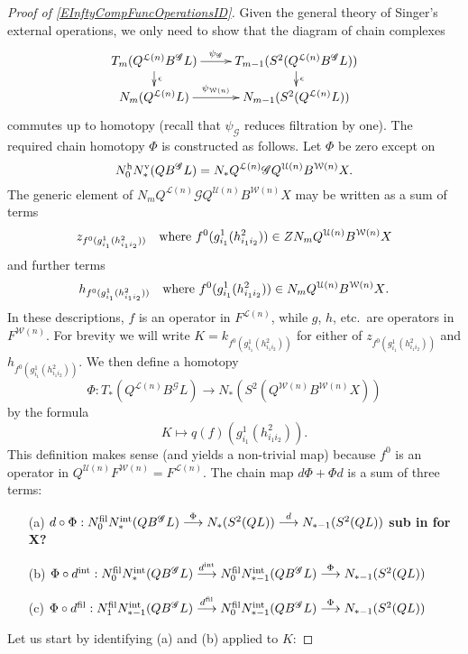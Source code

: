 \documentclass[11pt]{amsart}
\theoremstyle{plain}
\theoremstyle{definition}
\renewcommand{\to}{\longrightarrow}
\newcommand{\squishlist}{
  \setlength{\itemsep}{.5pt}
  \setlength{\parskip}{0pt}
  \setlength{\parsep}{0pt}}
\newcommand{\scrG}{\mathscr{G}}
\newcommand{\calU}{\mathcal{U}}
\newcommand{\calL}{\mathcal{L}}
\newcommand{\calw}{\mathcal{W}}
\theoremstyle{plain}
\newcommand{\BSW}{{\scrG}}
\newcommand{\BSWres}{B^\BSW}%
\begin{document}
\begin{Operations in composite functor spectral sequences}
\begin{proof}[Proof of \ref{EInftyCompFuncOperationsID}]
Given the general theory of Singer's external operations, we only need to show that the diagram of chain complexes
\[\xymatrix@R=4mm{
T_{m}(Q^{\calL(n)}\BSWres L)
\ar[r]^-{\psi_{\BSW}}
\ar[d]^-{\epsilon}
&%
T_{m-1}(S^2(Q^{\calL(n)}\BSWres L))\ar[d]^-{\epsilon}
\\%
N_{m}(Q^{\calL(n)}L)
\ar[r]^-{\psi_{\calw(n)}}
&%
N_{m-1}(S^2(Q^{\calL(n)} L))
}\]
commutes up to homotopy (recall that $\psi_{\BSW}$ reduces filtration by one). The required chain homotopy $\Phi$ is constructed as follows. Let $\Phi$ be zero except on 
\[N_0^\textup{h}N_*^\textup{v}(Q\BSWres L)=N_*Q^{\calL(n)}\BSW Q^{\calU(n)}B^{\calw(n)}X.\]
The generic element of $N_mQ^{\calL(n)}\BSW Q^{\calU(n)}B^{\calw(n)}X$ may be written as a sum of terms
\[z_{f^0(g^1_{i_1}(h^2_{i_1i_2}))}\textup{\quad where $f^0(g^1_{i_1}(h^2_{i_1i_2}))\in ZN_m Q^{\calU(n)}B^{\calw(n)}X$}\]
and further terms
\[h_{f^0(g^1_{i_1}(h^2_{i_1i_2}))}\textup{\quad where $f^0(g^1_{i_1}(h^2_{i_1i_2}))\in N_{m} Q^{\calU(n)}B^{\calw(n)}X$}.\]
In these descriptions, $f$ is an operator in $F^{\calL(n)}$, while $g$, $h$, etc.\ are operators in $F^{\calw(n)}$.
For brevity we will write $K=k_{f^0(g^1_{i_1}(h^2_{i_1i_2}))}$ for either of $z_{f^0(g^1_{i_1}(h^2_{i_1i_2}))}$ and $h_{f^0(g^1_{i_1}(h^2_{i_1i_2}))}$.
We then define a homotopy 
\[\Phi:T_*(Q^{\calL(n)}\BSWres L)\to N_*(S^2(Q^{\calw(n)}B^{\calw(n)}X))\]
by the formula
\[K\mapsto q(f)(g^1_{i_1}(h^2_{i_1i_2})).\]
This definition makes sense (and yields a non-trivial map) because $f^0$ is an operator in $Q^{\calU(n)}F^{\calw(n)}=F^{\calL(n)}$.
The chain map $d\Phi+\Phi d$ is a sum of three terms:
\begin{enumerate}\squishlist
\setlength{\parindent}{.25in}
\item[(a)] $d\circ\Phi:N_0^\textup{fil}N_*^\textup{int}(Q\BSWres L)\overset{\Phi}{\to} N_*(S^2(QL))\overset{d}{\to} N_{*-1}(S^2(QL))$ \textbf{sub in for X?}
\item[(b)] $\Phi\circ d^\textup{int}:N_0^\textup{fil}N_{*}^\textup{int}(Q\BSWres L)\overset{d^\textup{int}}{\to} N_0^\textup{fil}N_{*-1}^\textup{int}(Q\BSWres L)\overset{\Phi}{\to} N_{*-1}(S^2(QL))$
\item[(c)] $\Phi\circ d^\textup{fil}:N_1^\textup{fil}N_{*-1}^\textup{int}(Q\BSWres L)\overset{d^\textup{fil}}{\to} N_0^\textup{fil}N_{*-1}^\textup{int}(Q\BSWres L)\overset{\Phi}{\to} N_{*-1}(S^2(QL))$
\end{enumerate}
Let us start by identifying (a) and (b) applied to $K$:

\end{proof}
\end{Operations in composite functor spectral sequences}
\end{document}

